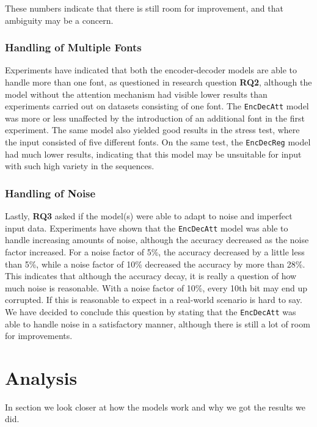 These numbers indicate that there is still room for improvement, and that ambiguity may be a concern.

\subsubsection{Handling of Multiple Fonts}
Experiments have indicated that both the encoder-decoder models are able to handle more than one font, as questioned in research question \textbf{RQ2}, although the model without the attention mechanism had visible lower results than experiments carried out on datasets consisting of one font. The {\tt EncDecAtt} model was more or less unaffected by the introduction of an additional font in the first experiment. The same model also yielded good results in the stress test, where the input consisted of five different fonts. On the same test, the {\tt EncDecReg} model had much lower results, indicating that this model may be unsuitable for input with such high variety in the sequences.

\subsubsection{Handling of Noise}
Lastly, \textbf{RQ3} asked if the model(s) were able to adapt to noise and imperfect input data. Experiments have shown that the {\tt EncDecAtt} model was able to handle increasing amounts of noise, although the accuracy decreased as the noise factor increased. For a noise factor of 5\%, the accuracy decreased by a little less than 5\%, while a noise factor of 10\% decreased the accuracy by more than 28\%. This indicates that although the accuracy decay, it is really a question of how much noise is reasonable. With a noise factor of 10\%, every 10th bit may end up corrupted. If this is reasonable to expect in a real-world scenario is hard to say. We have decided to conclude this question by stating that the {\tt EncDecAtt} was able to handle noise in a satisfactory manner, although there is still a lot of room for improvements.


\section{Analysis}
\label{sec:reasoning}
In section we look closer at how the models work and why we got the results we did. 

